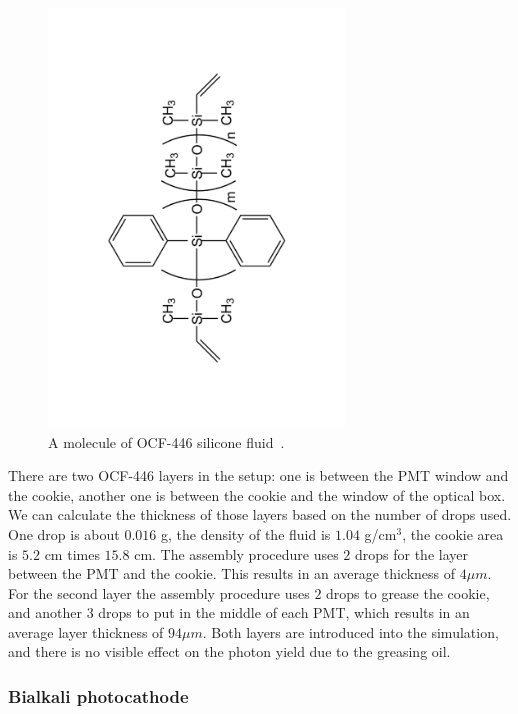 \begin{figure}[htb]
\centering
\includegraphics[angle=270,width=0.7\textwidth]{pics/ocf.pdf}
\caption{\label{pic:ocf}
A molecule of OCF-446 silicone fluid~\cite{formula}.
}
\end{figure}

There are two OCF-446 layers in the setup: one is between the PMT window and the cookie, another one is between the cookie and the window of the optical box. We can calculate the thickness of those layers based on the number of drops used. One drop is about $0.016$ g, the density of the fluid is $1.04$ g/cm$^{3}$, the cookie area is $5.2$ cm times $15.8$ cm. The assembly procedure uses $2$ drops for the layer between the PMT and the cookie. This results in an average thickness of $4 \mu m$. For the second layer the assembly procedure uses $2$ drops to grease the cookie, and another $3$ drops to put in the middle of each PMT, which results in an average layer thickness of $94 \mu m$. Both layers are introduced into the simulation, and there is no visible effect on the photon yield due to the greasing oil.

\subsubsection*{Bialkali photocathode}

